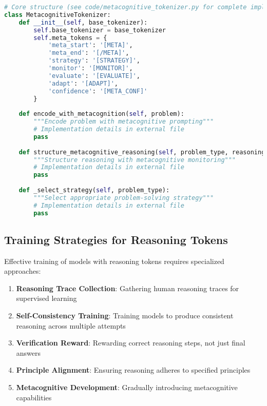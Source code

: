 \begin{lstlisting}[language=Python, caption=Metacognitive reasoning tokens]
# Core structure (see code/metacognitive_tokenizer.py for complete implementation)
class MetacognitiveTokenizer:
    def __init__(self, base_tokenizer):
        self.base_tokenizer = base_tokenizer
        self.meta_tokens = {
            'meta_start': '[META]',
            'meta_end': '[/META]',
            'strategy': '[STRATEGY]',
            'monitor': '[MONITOR]',
            'evaluate': '[EVALUATE]',
            'adapt': '[ADAPT]',
            'confidence': '[META_CONF]'
        }
        
    def encode_with_metacognition(self, problem):
        """Encode problem with metacognitive prompting"""
        # Implementation details in external file
        pass
    
    def structure_metacognitive_reasoning(self, problem_type, reasoning_process):
        """Structure reasoning with metacognitive monitoring"""
        # Implementation details in external file
        pass
    
    def _select_strategy(self, problem_type):
        """Select appropriate problem-solving strategy"""
        # Implementation details in external file
        pass
\end{lstlisting}

\subsection{Training Strategies for Reasoning Tokens}

Effective training of models with reasoning tokens requires specialized approaches:

\begin{enumerate}
\item \textbf{Reasoning Trace Collection}: Gathering human reasoning traces for supervised learning
\item \textbf{Self-Consistency Training}: Training models to produce consistent reasoning across multiple attempts
\item \textbf{Verification Reward}: Rewarding correct reasoning steps, not just final answers
\item \textbf{Principle Alignment}: Ensuring reasoning adheres to specified principles
\item \textbf{Metacognitive Development}: Gradually introducing metacognitive capabilities
\end{enumerate}

